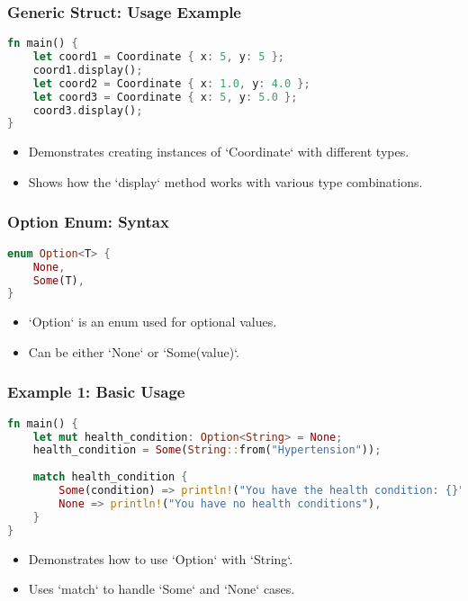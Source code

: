 \documentclass[aspectratio=169, table]{beamer}
\begin{document}
\begin{frame}[fragile]
\frametitle{Generic Struct: Usage Example}
\begin{lstlisting}[language=Rust]
fn main() {
	let coord1 = Coordinate { x: 5, y: 5 };
	coord1.display();
	let coord2 = Coordinate { x: 1.0, y: 4.0 };
	let coord3 = Coordinate { x: 5, y: 5.0 };
	coord3.display();
}
\end{lstlisting}
\begin{itemize}
\item Demonstrates creating instances of `Coordinate` with different types.
\item Shows how the `display` method works with various type combinations.
\end{itemize}
\end{frame}


\begin{frame}[fragile]
\frametitle{Option Enum: Syntax}
\begin{lstlisting}[language=Rust]
enum Option<T> {
	None,
	Some(T),
}
\end{lstlisting}
\begin{itemize}
\item `Option` is an enum used for optional values.
\item Can be either `None` or `Some(value)`.
\end{itemize}
\end{frame}

\begin{frame}[fragile]
\frametitle{Example 1: Basic Usage}
\begin{lstlisting}[language=Rust]
fn main() {
	let mut health_condition: Option<String> = None;
	health_condition = Some(String::from("Hypertension"));
	
	match health_condition {
		Some(condition) => println!("You have the health condition: {}", condition),
		None => println!("You have no health conditions"),
	}
}
\end{lstlisting}
\begin{itemize}
\item Demonstrates how to use `Option` with `String`.
\item Uses `match` to handle `Some` and `None` cases.
\end{itemize}
\end{frame}
\end{document}
